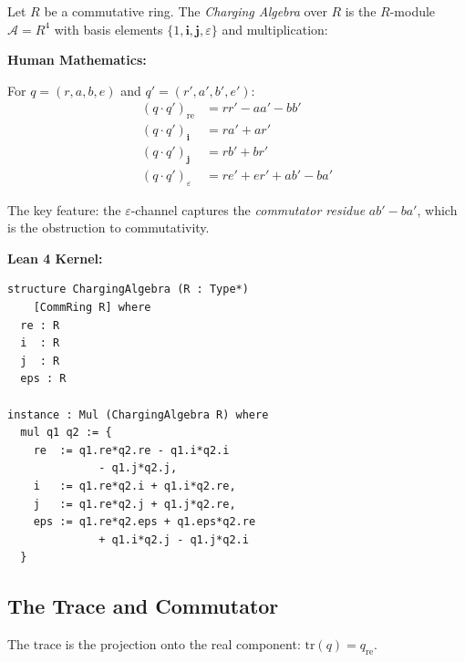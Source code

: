 \begin{definition}
\label{def:charging-algebra}
Let $R$ be a commutative ring. The \emph{Charging Algebra} over $R$ is
the $R$-module $\mathcal{A} = R^4$ with basis elements
$\{1, \mathbf{i}, \mathbf{j}, \varepsilon\}$ and multiplication:

\begin{minipage}[t]{0.48\textwidth}
\textbf{Human Mathematics:}

For $q = (r, a, b, e)$ and $q' = (r', a', b', e')$:
\begin{align}
  (q \cdot q')_{\mathrm{re}} &= rr' - aa' - bb' \\
  (q \cdot q')_{\mathbf{i}} &= ra' + ar' \\
  (q \cdot q')_{\mathbf{j}} &= rb' + br' \\
  (q \cdot q')_{\varepsilon} &= re' + er' + ab' - ba'
\end{align}

The key feature: the $\varepsilon$-channel captures the
\emph{commutator residue} $ab' - ba'$, which is the obstruction
to commutativity.
\end{minipage}
\hfill
\begin{minipage}[t]{0.48\textwidth}
\textbf{Lean 4 Kernel:}
\begin{lstlisting}[language=lean,basicstyle=\ttfamily\scriptsize]
structure ChargingAlgebra (R : Type*)
    [CommRing R] where
  re : R
  i  : R
  j  : R
  eps : R

instance : Mul (ChargingAlgebra R) where
  mul q1 q2 := {
    re  := q1.re*q2.re - q1.i*q2.i
              - q1.j*q2.j,
    i   := q1.re*q2.i + q1.i*q2.re,
    j   := q1.re*q2.j + q1.j*q2.re,
    eps := q1.re*q2.eps + q1.eps*q2.re
              + q1.i*q2.j - q1.j*q2.i
  }
\end{lstlisting}
\end{minipage}
\end{definition}

\subsection{The Trace and Commutator}

\begin{definition}[Trace]
The trace is the projection onto the real component:
$\mathrm{tr}(q) = q_{\mathrm{re}}$.
\end{definition}

